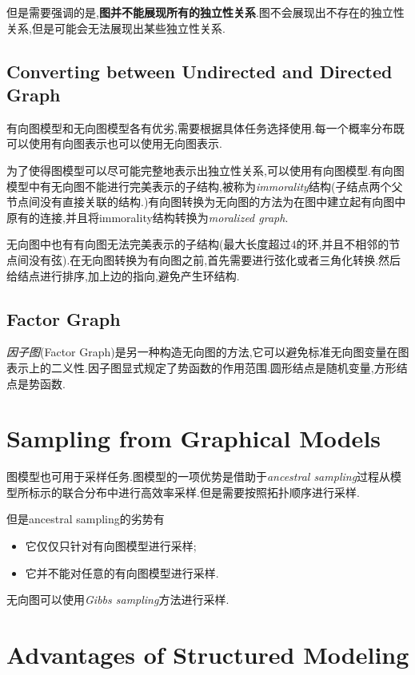 但是需要强调的是,\textbf{图并不能展现所有的独立性关系}.图不会展现出不存在的独立性关系,但是可能会无法展现出某些独立性关系.

\subsection{Converting between Undirected and Directed Graph}

有向图模型和无向图模型各有优劣,需要根据具体任务选择使用.每一个概率分布既可以使用有向图表示也可以使用无向图表示.

为了使得图模型可以尽可能完整地表示出独立性关系,可以使用有向图模型.有向图模型中有无向图不能进行完美表示的子结构,被称为\textit{immorality}结构(子结点两个父节点间没有直接关联的结构.)有向图转换为无向图的方法为在图中建立起有向图中原有的连接,并且将immorality结构转换为\textit{moralized graph}.

无向图中也有有向图无法完美表示的子结构(最大长度超过4的环,并且不相邻的节点间没有弦).在无向图转换为有向图之前,首先需要进行弦化或者三角化转换.然后给结点进行排序,加上边的指向,避免产生环结构.

\subsection{Factor Graph}

\textit{因子图}(Factor Graph)是另一种构造无向图的方法,它可以避免标准无向图变量在图表示上的二义性.因子图显式规定了势函数的作用范围.圆形结点是随机变量,方形结点是势函数.

\section{Sampling from Graphical Models}

图模型也可用于采样任务.图模型的一项优势是借助于\textit{ancestral sampling}过程从模型所标示的联合分布中进行高效率采样.但是需要按照拓扑顺序进行采样.

但是ancestral sampling的劣势有
\begin{itemize}
    \item 它仅仅只针对有向图模型进行采样;
    \item 它并不能对任意的有向图模型进行采样.
\end{itemize}

无向图可以使用\textit{Gibbs sampling}方法进行采样.

\section{Advantages of Structured Modeling}

